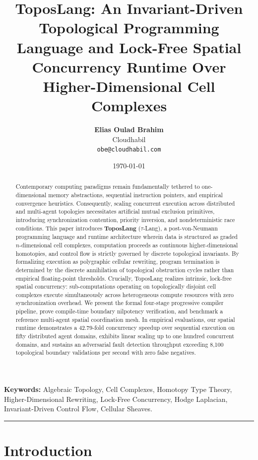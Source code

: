 \documentclass[10pt,a4paper]{article}
\title{\textbf{\Large ToposLang: An Invariant-Driven Topological Programming Language and Lock-Free Spatial Concurrency Runtime Over Higher-Dimensional Cell Complexes}}
\author{
    \textbf{Elias Oulad Brahim} \\
    Cloudhabil \\
    \texttt{obe@cloudhabil.com}
}
\date{\today}
\begin{document}
\maketitle

\begin{abstract}
Contemporary computing paradigms remain fundamentally tethered to one-dimensional memory abstractions, sequential instruction pointers, and empirical convergence heuristics. Consequently, scaling concurrent execution across distributed and multi-agent topologies necessitates artificial mutual exclusion primitives, introducing synchronization contention, priority inversion, and nondeterministic race conditions. This paper introduces \textbf{ToposLang} ($\tau$-Lang), a post-von-Neumann programming language and runtime architecture wherein data is structured as graded $n$-dimensional cell complexes, computation proceeds as continuous higher-dimensional homotopies, and control flow is strictly governed by discrete topological invariants. By formalizing execution as polygraphic cellular rewriting, program termination is determined by the discrete annihilation of topological obstruction cycles rather than empirical floating-point thresholds. Crucially, ToposLang realizes intrinsic, lock-free spatial concurrency: sub-computations operating on topologically disjoint cell complexes execute simultaneously across heterogeneous compute resources with zero synchronization overhead. We present the formal four-stage progressive compiler pipeline, prove compile-time boundary nilpotency verification, and benchmark a reference multi-agent spatial coordination mesh. In empirical evaluations, our spatial runtime demonstrates a 42.79-fold concurrency speedup over sequential execution on fifty distributed agent domains, exhibits linear scaling up to one hundred concurrent domains, and sustains an adversarial fault detection throughput exceeding 8,100 topological boundary validations per second with zero false negatives.
\end{abstract}

\noindent\textbf{Keywords:} Algebraic Topology, Cell Complexes, Homotopy Type Theory, Higher-Dimensional Rewriting, Lock-Free Concurrency, Hodge Laplacian, Invariant-Driven Control Flow, Cellular Sheaves.

\vspace{0.8em}
\hrule
\vspace{1em}

\section{Introduction}
\end{document}
